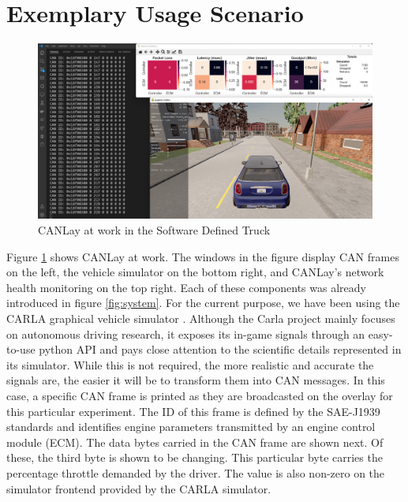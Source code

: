 \documentclass[letterpaper,twocolumn,12pt]{article}
\begin{document}
\section{Exemplary Usage Scenario}\label{sec:usage}
\begin{figure}[]
    \centering
    \includegraphics[width=\linewidth]{images/usability.png}
    \caption{CANLay at work in the Software Defined Truck}
    \label{fig:usabiity}
\end{figure}
Figure \ref{fig:usabiity} shows CANLay at work. The windows in the figure display CAN frames on the left, the vehicle simulator on the bottom right, and CANLay's network health monitoring on the top right. Each of these components was already introduced in figure \ref{fig:system}. For the current purpose, we have been using the CARLA graphical vehicle simulator \cite{Dosovitskiy17}. 
Although the Carla project mainly focuses on autonomous driving research, it exposes its in-game signals through an easy-to-use python API and pays close attention to the scientific details represented in its simulator. While this is not required, the more realistic and accurate the signals are, the easier it will be to transform them into CAN messages. In this case, a specific CAN frame is printed as they are broadcasted on the overlay for this particular experiment. The ID of this frame is defined by the SAE-J1939 standards \cite{society_of_automotive_engineers_sae_nodate} and identifies engine parameters transmitted by an engine control module (ECM). The data bytes carried in the CAN frame are shown next. Of these, the third byte is shown to be changing. This particular byte carries the percentage throttle demanded by the driver. The value is also non-zero on the simulator frontend provided by the CARLA simulator.
\end{document}
